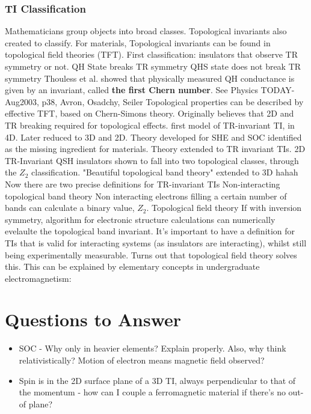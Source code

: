 \documentclass{article} %
\begin{document}
	\subsubsection{TI Classification}
		\begin{outline}
			\1 Mathematicians group objects into broad classes. Topological invariants also created to classify.
			\1 For materials, Topological invariants can be found in topological field theories (TFT).
				\2 First classification: insulators that observe TR symmetry or not.
					\3 QH State breaks TR symmetry
					\3 QHS state does not break TR symmetry
				\2 Thouless et al. showed that physically measured QH conductance is given by an invariant, called \textbf{the first Chern number}. {See Physics TODAY- Aug2003, p38, Avron, Osadchy, Seiler}
				\2 Topological properties can be described by effective TFT, based on Chern-Simons theory.
			\1 Originally believes that 2D and TR breaking required for topological effects.
				 first model of TR-invariant TI, in 4D.
				\2 Later reduced to 3D and 2D.
				\2 Theory developed for SHE and SOC identified as the missing ingredient for materials.
				\2 Theory extended to TR invariant TIs.
				\2 2D TR-Invariant QSH insulators shown to fall into two topological classes, through the $Z_2$ classification.
				\2 "Beautiful topological band theory" extended to 3D hahah
			\1 Now there are two precise definitions for TR-invariant TIs
				\2 Non-interacting topological band theory
					\3 Non interacting electrons filling a certain number of bands can calculate a binary value, $Z_2$.
				\2 Topological field theory
					\3 If with inversion symmetry, algorithm for electronic structure calculations can numerically evelaulte the topological band invariant.
			\1 It's important to have a definition for TIs that is valid for interacting systems (as insulators are interacting), whilst still being experimentally measurable. Turns out that topological field theory solves this.
			\1 This can be explained by elementary concepts in undergraduate electromagnetism:
				\2 
					
				
				
				
		\end{outline}
	


\section{Questions to Answer}
	\begin{itemize}
		\item SOC - Why only in heavier elements? Explain properly. Also, why think relativistically? Motion of electron means magnetic field observed?
		\item Spin is in the 2D surface plane of a 3D TI, always perpendicular to that of the momentum - how can I couple a ferromagnetic material if there's no out-of plane?
	\end{itemize}



\end{document}
